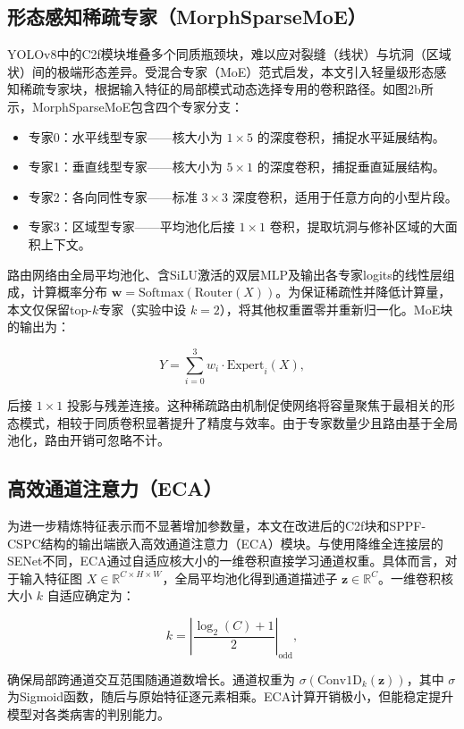\documentclass[twocolumn]{sn-jnl}
\begin{document}
	\subsection{形态感知稀疏专家（MorphSparseMoE）}
	YOLOv8中的C2f模块堆叠多个同质瓶颈块，难以应对裂缝（线状）与坑洞（区域状）间的极端形态差异。受混合专家（MoE）范式启发，本文引入轻量级形态感知稀疏专家块，根据输入特征的局部模式动态选择专用的卷积路径。如图2b所示，MorphSparseMoE包含四个专家分支：
	
	\begin{itemize}
		\item 专家0：水平线型专家——核大小为 \(1\times5\) 的深度卷积，捕捉水平延展结构。
		\item 专家1：垂直线型专家——核大小为 \(5\times1\) 的深度卷积，捕捉垂直延展结构。
		\item 专家2：各向同性专家——标准 \(3\times3\) 深度卷积，适用于任意方向的小型片段。
		\item 专家3：区域型专家——平均池化后接 \(1\times1\) 卷积，提取坑洞与修补区域的大面积上下文。
	\end{itemize}
	
	路由网络由全局平均池化、含SiLU激活的双层MLP及输出各专家logits的线性层组成，计算概率分布 \(\mathbf{w} = \text{Softmax}(\text{Router}(X))\)。为保证稀疏性并降低计算量，本文仅保留top-\(k\)专家（实验中设 \(k=2\)），将其他权重置零并重新归一化。MoE块的输出为：
	
	\[
	Y = \sum_{i=0}^{3} w_i \cdot \text{Expert}_i(X),
	\]
	
	后接 \(1\times1\) 投影与残差连接。这种稀疏路由机制促使网络将容量聚焦于最相关的形态模式，相较于同质卷积显著提升了精度与效率。由于专家数量少且路由基于全局池化，路由开销可忽略不计。
	
	\subsection{高效通道注意力（ECA）}
	为进一步精炼特征表示而不显著增加参数量，本文在改进后的C2f块和SPPF-CSPC结构的输出端嵌入高效通道注意力（ECA）模块。与使用降维全连接层的SENet不同，ECA通过自适应核大小的一维卷积直接学习通道权重。具体而言，对于输入特征图 \(X \in \mathbb{R}^{C \times H \times W}\)，全局平均池化得到通道描述子 \(\mathbf{z} \in \mathbb{R}^C\)。一维卷积核大小 \(k\) 自适应确定为：
	
	\[
	k = \left| \frac{\log_2(C) + 1}{2} \right|_{\text{odd}},
	\]
	
	确保局部跨通道交互范围随通道数增长。通道权重为 \(\sigma(\text{Conv1D}_{k}(\mathbf{z}))\)，其中 \(\sigma\) 为Sigmoid函数，随后与原始特征逐元素相乘。ECA计算开销极小，但能稳定提升模型对各类病害的判别能力。
	
\end{document}

